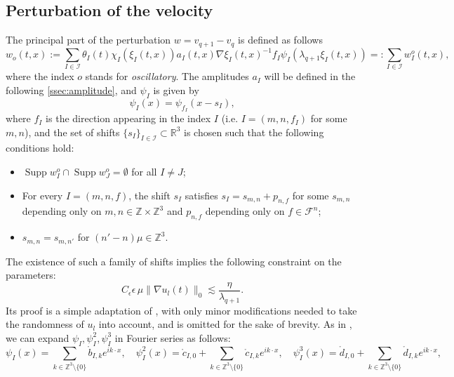 \documentclass[10pt,a4paper]{amsart}
\numberwithin{equation}{section}
\numberwithin{corollario}{section}
\numberwithin{lemma}{section}
\numberwithin{prop}{section}
\theoremstyle{definition}
\theoremstyle{remark}
\newcommand{\Z}{\mathbb{Z}}
\newcommand{\R}{\mathbb{R}}
\newcommand{\I}{\mathcal{I}}
\DeclareMathOperator{\supp}{Supp}
\newcommand{\qq}{_{q+1}}
\begin{document}
\subsection{Perturbation of the velocity}
The principal part of the perturbation $w=v_{q+1}-v_q$ is defined as follows
\begin{equation}\label{e:w0}
    w_o(t,x):=\sum_{I\in \I}\theta_I(t)\chi_I(\xi_I(t,x))a_I(t,x)\nabla\xi_I(t,x)^{-1}f_I\psi_{I}(\lambda\qq \xi_I(t,x))=:\sum_{I\in\I}w_I^o(t,x),
\end{equation}
where the index $o$ stands for \emph{oscillatory}.
The amplitudes $a_I$ will be defined in the following \autoref{ssec:amplitude}, and $\psi_I$ is given by
\begin{equation}\label{e:psiI}
    \psi_I(x)=\psi_{f_I}(x-s_I),
\end{equation}
where $f_I$ is the direction appearing in the index $I$ (i.e. $I=(m,n,f_I)$ for some $m,n$), and the set of shifts $\{s_I\}_{I\in\I} \subset \R^3$ is chosen such that the following conditions hold:
\begin{itemize}
    \item $\supp w_I^o\cap\supp w_J^o=\emptyset$ for all $I\neq J$;
    \item For every $I=(m,n,f)$, the shift $s_I$ satisfies $s_I=s_{m,n}+p_{n,f}$ for some $s_{m,n}$ depending only on $m,n \in \Z \times \Z^3$ and $p_{n,f}$ depending only on $f \in \mathcal{F}^n$;
    \item $s_{m,n}=s_{m,n'}$ for $(n'-n)\mu \in \Z^3$.
\end{itemize}
The existence of such a family of shifts implies the following constraint on the parameters:
\begin{equation}
    C_\epsilon \epsilon\,\mu\|\nabla u_l(t)\|_0\lesssim\frac{\eta}{\lambda\qq}. 
\end{equation}
Its proof is a simple adaptation of \cite[Proposition 3.5]{DLK23}, with only minor modifications needed to take the randomness of $u_l$ into account, and is omitted for the sake of brevity. 
As in \cite{DLK23}, we can expand $\psi_I,\psi^2_I,\psi^3_I$ in Fourier series as follows:
\begin{equation}
    \psi_I(x)
    =
    \sum_{k\in\Z^3\setminus\{0\}}\mathring{b}_{I,k}e^{ik\cdot x}
    ,\quad 
    \psi^2_I(x)
    =
    \mathring{c}_{I,0}+\sum_{k\in\Z^3\setminus\{0\}}\mathring{c}_{I,k}e^{ik\cdot x},
    \quad 
    \psi^3_I(x)=\mathring{d}_{I,0}+\sum_{k\in\Z^3\setminus\{0\}}\mathring{d}_{I,k}e^{ik\cdot x},
\end{equation}
\end{document}
